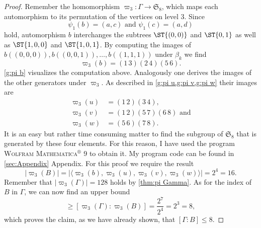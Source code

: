 \begin{proof}
Remember the homomorphism $\varpi_3\colon\Gamma\to\mathfrak{S}_8$, which maps each automorphism to its permutation of the vertices on level 3. Since
\begin{equation*}
\psi_1(b)=(a,c)\text{ and }\psi_1(c)=(a,d)
\end{equation*}
hold, automorphism $b$ interchanges the subtrees $\ST{(0,0)}$ and $\ST{0,1}$ as well as $\ST{1,0,0}$ and $\ST{1,0,1}$. By computing the images of $b((0,0,0)),b((0,0,1)),\ldots,b((1,1,1))$ under $\beta_k$ we find
\begin{equation*}
\varpi_3(b)=(1\,3)(2\,4)(5\,6).
\end{equation*}
\cref{g:pi b} visualizes the computation above. Analogously one derives the images of the other generators under $\varpi_3$. As described in \cref{g:pi u,g:pi v,g:pi w} their images are
\begin{align*}
\varpi_3(u)	&=(1\,2)(3\,4),\\
\varpi_3(v)	&=(1\,2)(5\,7)(6\,8)\text{ and}\\
\varpi_3(w)	&=(5\,6)(7\,8).
\end{align*}
It is an easy but rather time consuming matter to find the subgroup of $\mathfrak{S}_8$ that is generated by these four elements. For this reason, I have used the program \textsc{Wolfram Mathematica$^\circledR$ 9} to obtain it. My program code can be found in \ref{sec:Appendix} Appendix. For this proof we require the result
\begin{equation*}
\lvert\varpi_3(B)\rvert=\lvert\langle\varpi_3(b),\varpi_3(u),\varpi_3(v),\varpi_3(w)\rangle\rvert=2^4=16.
\end{equation*}
Remember that $\lvert \varpi_3(\Gamma)\rvert=128$ holds by \cref{thm:pi Gamma}. As for the index of $B$ in $\Gamma$, we can now find an upper bound
\begin{equation*}
[\Gamma:B]\geq [\varpi_3(\Gamma):\varpi_3(B)]=\frac{2^7}{2^4}=2^3=8,
\end{equation*}
which proves the claim, as we have already shown, that $[\Gamma:B]\leq 8$.
\end{proof}


